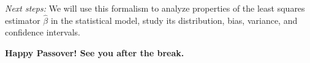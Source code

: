 \documentclass[11pt]{article}
\theoremstyle{definition}
\theoremstyle{plain}
\theoremstyle{definition}
\begin{document}
\emph{Next steps:} We will use this formalism to analyze properties of the least squares estimator \(\hat{\beta}\) in the statistical model, study its distribution, bias, variance, and confidence intervals.

\vspace{1em}
\begin{center}
{\large \textbf{Happy Passover! See you after the break.}}
\end{center}
\end{document}
